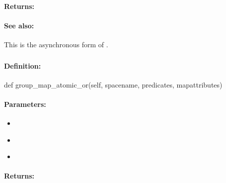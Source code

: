 \paragraph{Returns:}


\paragraph{See also:}  This is the asynchronous form of .

\pagebreak
\subsubsection{}
\label{api:python:group_map_atomic_or}


\paragraph{Definition:}
\begin{pythoncode}
def group_map_atomic_or(self, spacename, predicates, mapattributes)
\end{pythoncode}

\paragraph{Parameters:}
\begin{itemize}[noitemsep]
\item {}\\

\item {}\\

\item {}\\

\end{itemize}

\paragraph{Returns:}


\pagebreak
